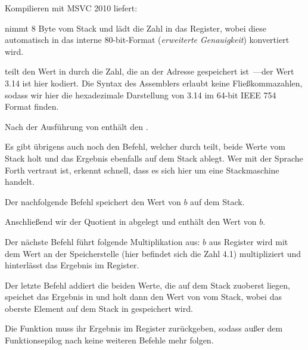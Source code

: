 
Kompilieren mit MSVC 2010 liefert:



\FLD nimmt 8 Byte vom Stack und lädt die Zahl in das  Register, wobei
diese automatisch in das interne 80-bit-Format (\emph{erweiterte Genauigkeit})
konvertiert wird.

\FDIV teilt den Wert in  durch die Zahl, die an der Adresse
 gespeichert ist~---der Wert 3.14 ist hier
kodiert.
Die Syntax des Assemblers erlaubt keine Fließkommazahlen, sodass wir hier die
hexadezimale Darstellung von 3.14 im 64-bit IEEE 754 Format finden.

Nach der Ausführung von \FDIV enthält  den .

Es gibt übrigens auch noch den \FDIVP Befehl, welcher  durch 
teilt, beide Werte vom Stack holt und das Ergebnis ebenfalls auf dem Stack
ablegt.
Wer mit der Sprache Forth vertraut ist, erkennt schnell, dass es sich
hier um eine Stackmaschine handelt.

Der nachfolgende \FLD Befehl speichert den Wert von $b$ auf dem Stack.

Anschließend wir der Quotient in  abgelegt und  enthält den Wert von
$b$.

Der nächste \FMUL Befehl führt folgende Multiplikation aus: $b$ aus Register
 wird mit dem Wert an der Speicherstelle 
(hier befindet sich die Zahl 4.1) multipliziert und hinterlässt das Ergebnis im
 Register.

Der letzte \FADDP Befehl addiert die beiden Werte, die auf dem Stack zuoberst
liegen, speichet das Ergebnis in  und holt dann den Wert von  vom
Stack, wobei das oberste Element auf dem Stack in  gespeichert wird.

Die Funktion muss ihr Ergebnis im  Register zurückgeben, sodass außer dem
Funktionsepilog nach \FADDP keine weiteren Befehle mehr folgen.



